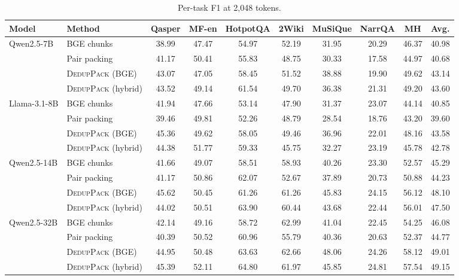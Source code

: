 \documentclass[11pt]{article}
\newcommand{\spk}{\textsc{DedupPack}}
\begin{document}
\begin{table}[t]
\centering
\small
\setlength{\tabcolsep}{4pt}
\begin{tabular}{llcccccc|cc}
\toprule
Model & Method & Qasper & MF-en & HotpotQA & 2Wiki & MuSiQue & NarrQA & MH & Avg. \\
\midrule
\multirow{4}{*}{Qwen2.5-7B}
 & BGE chunks & 38.99 & 47.47 & 54.97 & 52.19 & 31.95 & 20.29 & 46.37 & 40.98 \\
 & Pair packing & 41.17 & 50.41 & 55.83 & 48.75 & 30.33 & 17.58 & 44.97 & 40.68 \\
 & \spk{} (BGE) & 43.07 & 47.05 & 58.45 & 51.52 & 38.88 & 19.90 & 49.62 & 43.14 \\
 & \spk{} (hybrid) & 43.52 & 49.14 & 61.54 & 49.70 & 36.38 & 21.31 & 49.20 & 43.60 \\
\midrule
\multirow{4}{*}{Llama-3.1-8B}
 & BGE chunks & 41.94 & 47.66 & 53.14 & 47.90 & 31.37 & 23.07 & 44.14 & 40.85 \\
 & Pair packing & 39.46 & 49.81 & 52.26 & 48.79 & 28.54 & 18.76 & 43.20 & 39.60 \\
 & \spk{} (BGE) & 45.36 & 49.62 & 58.05 & 49.46 & 36.96 & 22.01 & 48.16 & 43.58 \\
 & \spk{} (hybrid) & 44.38 & 51.77 & 59.33 & 45.75 & 32.27 & 23.19 & 45.78 & 42.78 \\
\midrule
\multirow{4}{*}{Qwen2.5-14B}
 & BGE chunks & 41.66 & 49.07 & 58.51 & 58.93 & 40.26 & 23.30 & 52.57 & 45.29 \\
 & Pair packing & 41.17 & 50.86 & 62.07 & 52.67 & 37.89 & 20.73 & 50.88 & 44.23 \\
 & \spk{} (BGE) & 45.62 & 50.45 & 61.26 & 61.26 & 45.83 & 24.15 & 56.12 & 48.10 \\
 & \spk{} (hybrid) & 44.02 & 50.51 & 63.90 & 60.44 & 43.68 & 22.44 & 56.01 & 47.50 \\
\midrule
\multirow{4}{*}{Qwen2.5-32B}
 & BGE chunks & 42.14 & 49.16 & 58.72 & 62.99 & 41.04 & 22.45 & 54.25 & 46.08 \\
 & Pair packing & 40.39 & 50.52 & 60.96 & 55.79 & 40.36 & 20.63 & 52.37 & 44.77 \\
 & \spk{} (BGE) & 44.95 & 50.48 & 63.63 & 62.66 & 48.06 & 24.26 & 58.12 & 49.01 \\
 & \spk{} (hybrid) & 45.39 & 52.11 & 64.80 & 61.97 & 45.85 & 24.81 & 57.54 & 49.15 \\
\bottomrule
\end{tabular}
\caption{Per-task F1 at 2,048 tokens.}
\label{tab:pertask2048}
\end{table}
\end{document}
